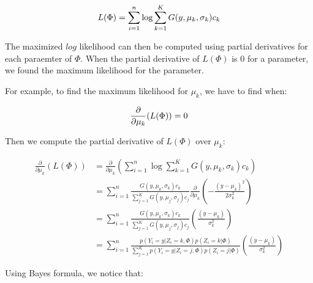   \begin{equation}\label{LP}
  L(\Phi)=\sum_{i=1}^n \operatorname*{log} \sum_{k=1}^K G(y,\mu_k,\sigma_k)c_k\\
  \end{equation}

The maximized $log$ likelihood can then be computed using partial derivatives for each paraemter of $\Phi$. When the partial derivative of $L(\Phi)$ is $0$ for a parameter, we found the maximum likelihood for the parameter.
\par
For example, to find the maximum likelihood for $\mu_k$, we have to find when:

  \begin{equation}\label{PD}
  \frac{\partial}{\partial\mu_k}(L(\Phi))=0\\
  \end{equation}

\par
Then we compute the partial derivative of $L(\Phi)$ over $\mu_k$:

  \begin{align}\label{partialDerivative}
  \frac{\partial}{\partial\mu_k}(L(\Phi)) &= \frac{\partial}{\partial\mu_k}( \sum_{i=1}^n \operatorname*{log} \sum_{k=1}^K G(y,\mu_k,\sigma_k)c_k\nonumber)  \\
                                          &= \sum_{i=1}^n \frac{G(y,\mu_k,\sigma_k)c_k}{\sum_{j=1}^K G(y,\mu_j,\sigma_j)c_j}\frac{\partial}{\partial\mu_k}  (-\frac{(y-\mu_k)^2}{2\sigma_k^2}) \nonumber \\
                                          &= \sum_{i=1}^n \frac{G(y,\mu_k,\sigma_k)c_k}{\sum_{j=1}^K G(y,\mu_j,\sigma_j)c_j}(\frac{(y-\mu_k)}{\sigma_k^2}) \nonumber \\
                                          &= \sum_{i=1}^n \frac{p(Y_i=y|Z_i=k,\Phi)p(Z_i=k|\Phi)}{\sum_{j=1}^K p(Y_i=y|Z_i=j,\Phi)p(Z_i=j|\Phi)}(\frac{(y-\mu_k)} {\sigma_k^2})
  \end{align}

Using Bayes formula, we notice that:

